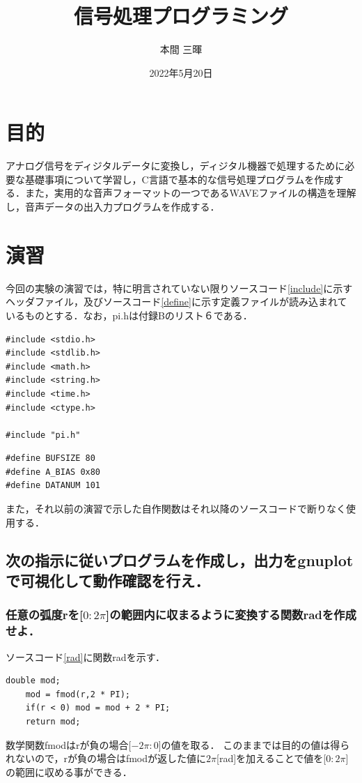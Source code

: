 \documentclass[titlepage]{jarticle}
\title{信号処理プログラミング}
\author{本間 三暉}
\date{2022年5月20日}
\begin{document}
\maketitle

\section{目的}
アナログ信号をディジタルデータに変換し，ディジタル機器で処理するために必要な基礎事項について学習し，C言語で基本的な信号処理プログラムを作成する．また，実用的な音声フォーマットの一つであるWAVEファイルの構造を理解し，音声データの出入力プログラムを作成する．
\section{演習}
今回の実験の演習では，特に明言されていない限りソースコード\ref{include}に示すヘッダファイル，及びソースコード\ref{define}に示す定義ファイルが読み込まれているものとする．なお，pi.hは付録Bのリスト６である．
\begin{lstlisting}[caption=ヘッダファイル,label=include]
#include <stdio.h>
#include <stdlib.h>
#include <math.h>
#include <string.h>
#include <time.h>
#include <ctype.h>

#include "pi.h"
  \end{lstlisting}
\begin{lstlisting}[caption=定義ファイル,label=define]
#define BUFSIZE 80
#define A_BIAS 0x80
#define DATANUM 101 
  \end{lstlisting}

また，それ以前の演習で示した自作関数はそれ以降のソースコードで断りなく使用する．
\subsection{次の指示に従いプログラムを作成し，出力をgnuplotで可視化して動作確認を行え．}
\subsubsection{任意の弧度rを[$0:2\pi$]の範囲内に収まるように変換する関数radを作成せよ．}
ソースコード\ref{rad}に関数radを示す．
\begin{lstlisting}[caption=double rad(double r),label=rad]
    double mod;
    mod = fmod(r,2 * PI);
    if(r < 0) mod = mod + 2 * PI;
    return mod;
   \end{lstlisting}

数学関数fmodはrが負の場合[$-2\pi:0$]の値を取る．
このままでは目的の値は得られないので，rが負の場合はfmodが返した値に$2\pi$[rad]を加えることで値を[$0:2\pi$]の範囲に収める事ができる．
\end{document}

